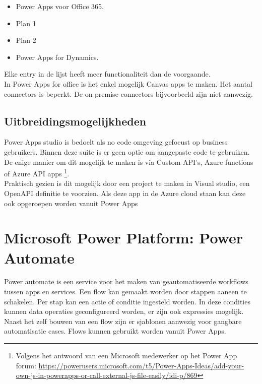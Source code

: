 \begin{itemize}
    \item Power Apps voor Office 365.
    \item Plan 1
    \item Plan 2
    \item Power Apps for Dynamics.
\end{itemize} \autocite{Pohl2019}

Elke entry in de lijst heeft meer functionaliteit dan de voorgaande.\\
In Power Apps for office is het enkel mogelijk Canvas apps te maken. Het aantal connectors is beperkt. De on-premise connectors bijvoorbeeld zijn niet aanwezig.

\subsection{Uitbreidingsmogelijkheden}

Power Apps studio is bedoelt als no code omgeving gefocust op business gebruikers. Binnen deze suite is er geen optie om aangepaste code te gebruiken. De enige manier om dit mogelijk te maken is via Custom API's, Azure functions of Azure API apps \footnote{Volgens het antwoord van een Microsoft medewerker op het Power App forum: \url{https://powerusers.microsoft.com/t5/Power-Apps-Ideas/add-your-own-js-in-powerapps-or-call-external-js-file-easily/idi-p/869}}.\\
Praktisch gezien is dit mogelijk door een project te maken in Visual studio, een OpenAPI definitie te voorzien. Als deze app in de Azure cloud staan kan deze ook opgeroepen worden vanuit Power Apps \autocite{Jugo2019}

\section{Microsoft Power Platform: Power Automate}

Power automate is een service voor het maken van geautomatiseerde workflows tussen apps en services. Een flow kan gemaakt worden door stappen aaneen te schakelen. Per stap kan een actie of conditie ingesteld worden. In deze condities kunnen data operaties geconfigureerd worden, er zijn ook expressies mogelijk. Naast het zelf bouwen van een flow zijn er sjablonen aanwezig voor gangbare automatisatie cases. Flows kunnen gebruikt worden vanuit Power Apps. \autocite{MicrosoftDocs2019f}

